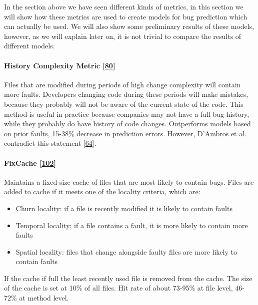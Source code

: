 \documentclass[]{book}
\providecommand{\tightlist}{%
  \setlength{\itemsep}{0pt}\setlength{\parskip}{0pt}}
\let\oldparagraph\paragraph
\renewcommand{\paragraph}[1]{\oldparagraph{#1}\mbox{}}
\begin{document}
In the section above we have seen different kinds of metrics, in this
section we will show how these metrics are used to create models for bug
prediction which can actually be used. We will also show some
preliminary results of these models, however, as we will explain later
on, it is not trivial to compare the results of different models.

\paragraph{\texorpdfstring{History Complexity Metric
{[}\protect\hyperlink{ref-hassan2009}{80}{]}}{History Complexity Metric {[}80{]}}}\label{history-complexity-metric-hassan2009}

Files that are modified during periods of high change complexity will
contain more faults. Developers changing code during these periods will
make mistakes, because they probably will not be aware of the current
state of the code. This method is useful in practice because companies
may not have a full bug history, while they probably do have history of
code changes. Outperforms models based on prior faults, 15-38\% decrease
in prediction errors. However, D'Ambros et al. contradict this statement
{[}\protect\hyperlink{ref-DAmbros2010}{64}{]}.

\paragraph{\texorpdfstring{FixCache
{[}\protect\hyperlink{ref-kim2007}{102}{]}}{FixCache {[}102{]}}}\label{fixcache-kim2007}

Maintains a fixed-size cache of files that are most likely to contain
bugs. Files are added to cache if it meets one of the locality criteria,
which are:

\begin{itemize}
\tightlist
\item
  Churn locality: if a file is recently modified it is likely to contain
  faults
\item
  Temporal locality: if a file contains a fault, it is more likely to
  contain more faults
\item
  Spatial locality: files that change alongside faulty files are more
  likely to contain faults
\end{itemize}

If the cache if full the least recently used file is removed from the
cache. The size of the cache is set at 10\% of all files. Hit rate of
about 73-95\% at file level, 46-72\% at method level.
\end{document}
